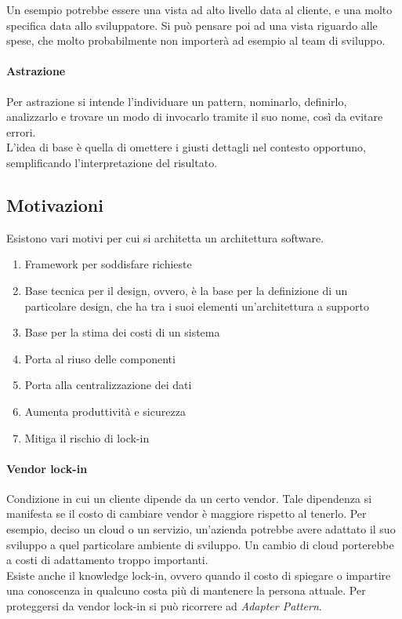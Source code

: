 Un esempio potrebbe essere una vista ad alto livello data al cliente, e una molto specifica 
data allo sviluppatore.
Si può pensare poi ad una vista riguardo alle spese, che molto probabilmente non importerà 
ad esempio al team di sviluppo. 

\paragraph{Astrazione}
Per astrazione si intende l'individuare un pattern, nominarlo, definirlo, 
analizzarlo e trovare un modo di invocarlo tramite il suo nome, così da evitare
errori.\\
L'idea di base è quella di omettere i giusti dettagli nel contesto opportuno, 
semplificando l'interpretazione del risultato.

\subsection{Motivazioni}

Esistono vari motivi per cui si architetta un architettura software.
\begin{enumerate}
    \item Framework per soddisfare richieste
    \item Base tecnica per il design, ovvero, è la base per la definizione di un
     particolare design, che ha tra i suoi elementi un'architettura a supporto
    \item Base per la stima dei costi di un sistema
    \item Porta al riuso delle componenti
    \item Porta alla centralizzazione dei dati
    \item Aumenta produttività e sicurezza
    \item Mitiga il rischio di lock-in
\end{enumerate}

\paragraph{Vendor lock-in}
Condizione in cui un cliente dipende da un certo vendor.
Tale dipendenza si manifesta se il costo di cambiare vendor è maggiore rispetto al 
tenerlo. Per esempio, deciso un cloud o un servizio, un'azienda potrebbe avere 
adattato il suo sviluppo a quel particolare ambiente di sviluppo. Un cambio di 
cloud porterebbe a costi di adattamento troppo importanti.\\
Esiste anche il knowledge lock-in, ovvero quando il costo di spiegare o impartire 
una conoscenza in qualcuno costa più di mantenere la persona attuale.
Per proteggersi da vendor lock-in si può ricorrere ad \emph{Adapter Pattern}.

